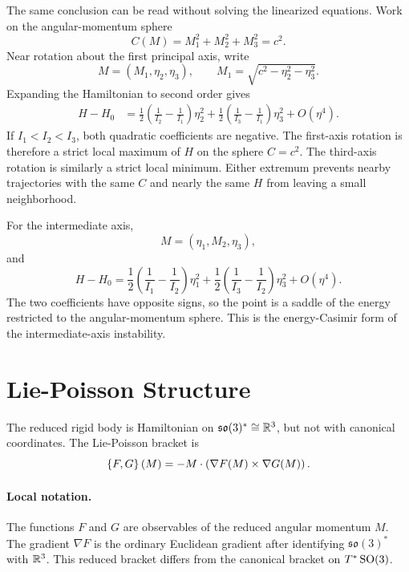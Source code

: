 \begin{derivation}
The same conclusion can be read without solving the linearized equations. Work
on the angular-momentum sphere
\[
  C(M)=M_1^2+M_2^2+M_3^2=c^2.
\]
Near rotation about the first principal axis, write
\[
  M=(M_1,\eta_2,\eta_3),
  \qquad
  M_1=\sqrt{c^2-\eta_2^2-\eta_3^2}.
\]
Expanding the Hamiltonian to second order gives
\[
\begin{aligned}
  H-H_0
  &=
  \frac12\left(\frac{1}{I_2}-\frac{1}{I_1}\right)\eta_2^2
  +
  \frac12\left(\frac{1}{I_3}-\frac{1}{I_1}\right)\eta_3^2
  +
  O(\eta^4).
\end{aligned}
\]
If \(I_1<I_2<I_3\), both quadratic coefficients are negative. The first-axis
rotation is therefore a strict local maximum of \(H\) on the sphere \(C=c^2\).
The third-axis rotation is similarly a strict local minimum. Either extremum
prevents nearby trajectories with the same \(C\) and nearly the same \(H\) from
leaving a small neighborhood.

For the intermediate axis,
\[
  M=(\eta_1,M_2,\eta_3),
\]
and
\[
  H-H_0
  =
  \frac12\left(\frac{1}{I_1}-\frac{1}{I_2}\right)\eta_1^2
  +
  \frac12\left(\frac{1}{I_3}-\frac{1}{I_2}\right)\eta_3^2
  +
  O(\eta^4).
\]
The two coefficients have opposite signs, so the point is a saddle of the
energy restricted to the angular-momentum sphere. This is the energy-Casimir
form of the intermediate-axis instability.
\end{derivation}

\section{Lie-Poisson Structure}
\label{sec:lie-poisson-rigid-body}

The reduced rigid body is Hamiltonian on \(\mathfrak{so}(3)^*\cong\mathbb{R}^3\), but
not with canonical coordinates. The Lie-Poisson bracket is
\[
  \left\{F,G\right\}(M)
  =
  -M\cdot\left(\nabla F(M)\times\nabla G(M)\right).
\]

\paragraph{Local notation.}
The functions \(F\) and \(G\) are observables of the reduced angular momentum
\(M\).  The gradient \(\nabla F\) is the ordinary Euclidean gradient after
identifying \(\mathfrak{so}(3)^*\) with \(\mathbb{R}^3\).  This reduced bracket differs
from the canonical bracket on \(T^*\operatorname{SO}(3)\).

